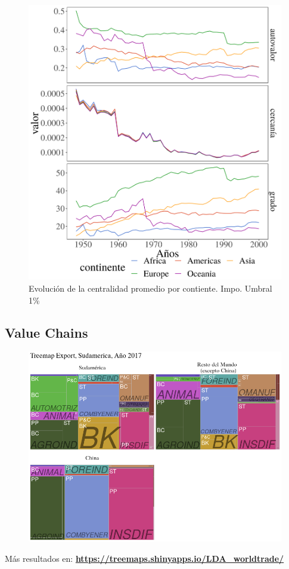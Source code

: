 \documentclass[compress]{beamer}
\begin{document}
\begin{frame}
	\begin{figure}
		\centering		\includegraphics[width=0.75\linewidth]{1950_2000_continent_all}
		\caption{Evolución de la centralidad promedio por contiente. Impo. Umbral 1\%}
		\label{fig:centralidad_LP}
	\end{figure}
	
\end{frame}

\subsection{Value Chains}
\begin{frame}
\begin{figure}
\includegraphics[scale=0.35]{uses_treemap}
\end{figure}

\small{Más resultados en: \textbf{\url{https://treemaps.shinyapps.io/LDA_worldtrade/}}}
\end{frame}
\end{document}
